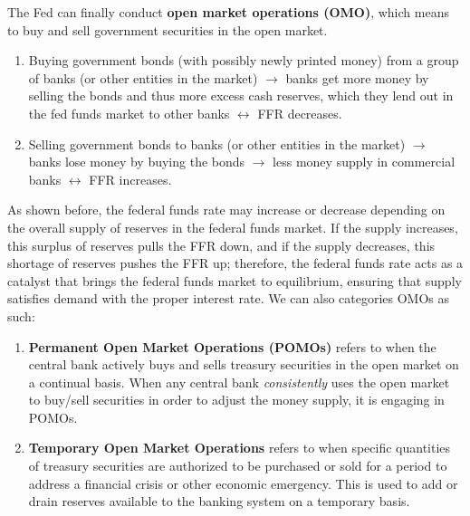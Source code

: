 \documentclass{article}
\begin{document}
    \begin{definition}
      The Fed can finally conduct \textbf{open market operations (OMO)}, which means to buy and sell government securities in the open market.
      \begin{enumerate}
        \item Buying government bonds (with possibly newly printed money) from a group of banks (or other entities in the market) $\rightarrow$ banks get more money by selling the bonds and thus more excess cash reserves, which they lend out in the fed funds market to other banks $\leftrightarrow$ FFR decreases. 
        \item Selling government bonds to banks (or other entities in the market) $\rightarrow$ banks lose money by buying the bonds $\rightarrow$ less money supply in commercial banks $\leftrightarrow$ FFR increases.
      \end{enumerate}
      As shown before, the federal funds rate may increase or decrease depending on the overall supply of reserves in the federal funds market. If the supply increases, this surplus of reserves pulls the FFR down, and if the supply decreases, this shortage of reserves pushes the FFR up; therefore, the federal funds rate acts as a catalyst that brings the federal funds market to equilibrium, ensuring that supply satisfies demand with the proper interest rate. 
      We can also categories OMOs as such: 
      \begin{enumerate}
          \item \textbf{Permanent Open Market Operations (POMOs)} refers to when the central bank actively buys and sells treasury securities in the open market on a continual basis. When any central bank \textit{consistently} uses the open market to buy/sell securities in order to adjust the money supply, it is engaging in POMOs. 
          \item \textbf{Temporary Open Market Operations} refers to when specific quantities of treasury securities are authorized to be purchased or sold for a period to address a financial crisis or other economic emergency. This is used to add or drain reserves available to the banking system on a temporary basis. 
      \end{enumerate}
    \end{definition}
\end{document}
